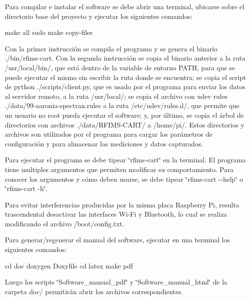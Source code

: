 Para compilar e instalar el software se debe abrir una terminal, ubicarse sobre el directorio base del proyecto y ejecutar los siguientes comandos\+: \begin{DoxyVerb}make all
sudo make copy-files
\end{DoxyVerb}


Con la primer instrucción se compila el programa y se genera el binario ./bin/rfims-\/cart. Con la segunda instrucción se copia el binario anterior a la ruta /usr/local/bin/, que está dentro de la variable de entorno P\+A\+TH, para que se puede ejecutar el mismo sin escribir la ruta donde se encuentra; se copia el script de python ./scripts/client.py, que es usado por el programa para enviar los datos al servidor remoto, a la ruta /usr/local/; se copia el archivo con udev rules ./data/99-\/aaronia-\/spectran.rules a la ruta /etc/udev/rules.d/, que permite que un usuario no root pueda ejecutar el software; y, por último, se copia el árbol de directorios con archivos ./data/\+R\+F\+I\+M\+S-\/\+C\+A\+R\+T/ a /home/pi/. Estos directorios y archivos son utilizados por el programa para cargar los parámetros de configuración y para almacenar las mediciones y datos capturados.

Para ejecutar el programa se debe tipear \char`\"{}rfims-\/cart\char`\"{} en la terminal. El programa tiene multiples argumentos que permiten modificar su comportamiento. Para conocer los argumentos y cómo deben usarse, se debe tipear \char`\"{}rfims-\/cart -\/-\/help\char`\"{} o \char`\"{}rfims-\/cart -\/h\char`\"{}.

Para evitar interferencias producidas por la misma placa Raspberry Pi, resulta trascendental desactivar las interfaces Wi-\/\+Fi y Bluetooth, lo cual se realiza modificando el archivo /boot/config.txt.

Para generar/regenerar el manual del software, ejecutar en una terminal los siguientes comandos\+: \begin{DoxyVerb}cd doc
doxygen Doxyfile
cd latex
make pdf
\end{DoxyVerb}


Luego los scripts \char`\"{}\+Software\+\_\+manual\+\_\+pdf\char`\"{} y \char`\"{}\+Software\+\_\+manual\+\_\+html\char`\"{} de la carpeta doc/ permitirán abrir los archivos correspondientes. 